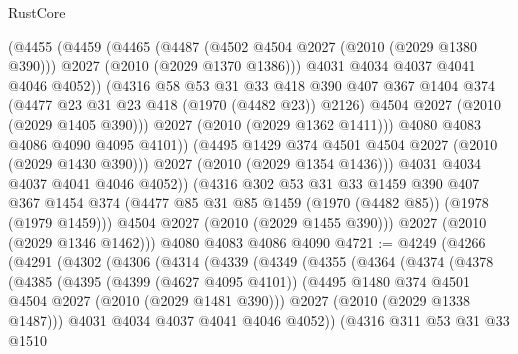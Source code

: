 \begin{lexlean}{RustCore}
\begin{coremodule}
                (@4455
                  (@4459
                    (@4465
                      (@4487
                        (@4502 @4504 @2027 (@2010 (@2029 @1380 @390)))
                        @2027
                        (@2010 (@2029 @1370 @1386)))
                      @4031
                      @4034
                      @4037
                      @4041
                      @4046
                      @4052))
                  (@4316
                    @58
                    @53
                    @31
                    @33
                    @418
                    @390
                    @407
                    @367
                    @1404
                    @374
                    (@4477 @23 @31 @23 @418 (@1970 (@4482 @23)) @2126)
                    @4504
                    @2027
                    (@2010 (@2029 @1405 @390)))
                  @2027
                  (@2010 (@2029 @1362 @1411)))
                @4080
                @4083
                @4086
                @4090
                @4095
                @4101))
            (@4495 @1429 @374 @4501 @4504 @2027 (@2010 (@2029 @1430 @390)))
            @2027
            (@2010 (@2029 @1354 @1436)))
          @4031
          @4034
          @4037
          @4041
          @4046
          @4052))
      (@4316
        @302
        @53
        @31
        @33
        @1459
        @390
        @407
        @367
        @1454
        @374
        (@4477 @85 @31 @85 @1459 (@1970 (@4482 @85)) (@1978 (@1979 @1459)))
        @4504
        @2027
        (@2010 (@2029 @1455 @390)))
      @2027
      (@2010 (@2029 @1346 @1462)))
    @4080
    @4083
    @4086
    @4090
@4721 := @4249
    (@4266
      (@4291
        (@4302
          (@4306
            (@4314
              (@4339
                (@4349
                  (@4355
                    (@4364
                      (@4374
                        (@4378
                          (@4385
                            (@4395
                              (@4399 (@4627 @4095 @4101))
                              (@4495 @1480 @374 @4501 @4504 @2027 (@2010 (@2029 @1481 @390)))
                              @2027
                              (@2010 (@2029 @1338 @1487)))
                            @4031
                            @4034
                            @4037
                            @4041
                            @4046
                            @4052))
                        (@4316
                          @311
                          @53
                          @31
                          @33
                          @1510

\end{coremodule}
\end{lexlean}
